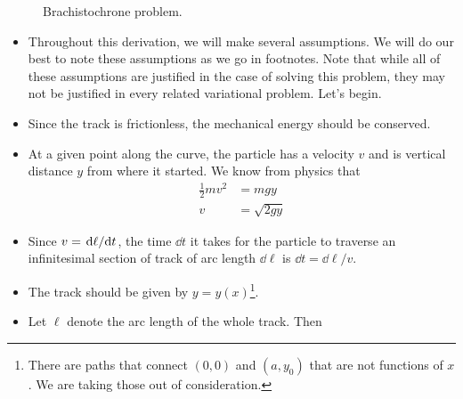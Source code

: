 \documentclass[../notes.tex]{subfiles}
\begin{document}
\begin{itemize}
\begin{figure}[h!]
        \caption{Brachistochrone problem.}
        \label{fig:brachistochroneSetup}
    \end{figure}
    \begin{itemize}
        \item Throughout this derivation, we will make several assumptions. We will do our best to note these assumptions as we go in footnotes. Note that while all of these assumptions are justified in the case of solving this problem, they may not be justified in every related variational problem. Let's begin.
        \item Since the track is frictionless, the mechanical energy should be conserved.
        \item At a given point along the curve, the particle has a velocity $v$ and is vertical distance $y$ from where it started. We know from physics that
        \begin{align*}
            \frac{1}{2}mv^2 &= mgy\\
            v &= \sqrt{2gy}
        \end{align*}
        \item Since $v=\dv*{\ell}{t}$, the time $\dd{t}$ it takes for the particle to traverse an infinitesimal section of track of arc length $\dd\ell$ is $\dd{t}=\dd\ell/v$.
        \item The track should be given by $y=y(x)$\footnote{There are paths that connect $(0,0)$ and $(a,y_0)$ that are not functions of $x$. We are taking those out of consideration.}.
        \item Let $\ell$ denote the arc length of the whole track. Then
        \begin{equation*}

\end{equation*}
\end{itemize}
\end{itemize}
\end{document}
